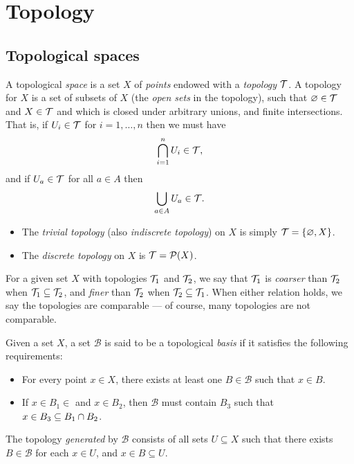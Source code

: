 \setchaptergraphic{}

\chapter{Topology}
\label{ch:topology}

\section{Topological spaces}

\begin{defn}
    A topological \emph{space} is a set $X$ of \emph{points} endowed with a \emph{topology} $\mathcal{T}$. A topology for $X$ is a set of subsets of $X$ (the \emph{open sets} in the topology), such that $\varnothing \in \mathcal{T}$ and $X \in \mathcal{T}$ and which is closed under arbitrary unions, and finite intersections. That is, if $U_i \in \mathcal{T}$ for $i = 1, \ldots, n$ then we must have
    \begin{align*}
        \bigcap_{i=1}^{n}U_i \in \mathcal{T},
    \end{align*}
    and if $U_{a} \in \mathcal{T}$ for all $a \in A$ then
    \begin{align*}
        \bigcup_{a\in A}U_a \in \mathcal{T}.
    \end{align*}
\end{defn}

\begin{exmp}\proofbreak
    \begin{itemize}
        \item The \emph{trivial topology} (also \emph{indiscrete topology}) on $X$ is simply $\mathcal{T} = \{\varnothing, X\}$.
        \item The \emph{discrete topology} on $X$ is $\mathcal{T} = \mathcal{P}(X)$. 
    \end{itemize}
\end{exmp}

\begin{defn}
    For a given set $X$ with topologies $\mathcal{T}_1$ and $\mathcal{T}_2$, we say that $\mathcal{T}_1$ is \emph{coarser} than $\mathcal{T}_2$ when $\mathcal{T}_1 \subseteq \mathcal{T}_2$, and \emph{finer} than $\mathcal{T}_2$ when $\mathcal{T}_2 \subseteq \mathcal{T}_1$. When either relation holds, we say the topologies are comparable ---  of course, many topologies are not comparable.
\end{defn}

\begin{defn}
    Given a set $X$, a set $\mathcal{B}$ is said to be a topological \emph{basis} if it satisfies the following requirements:
    \begin{itemize}
        \item For every point $x \in X$, there exists at least one $B \in \mathcal{B}$ such that $x \in B$.
        \item If $x \in B_1 \in$ and $x \in B_2$, then $\mathcal{B}$ must contain $B_3$ such that $x \in B_3 \subseteq B_1 \cap B_2$.
    \end{itemize}
    The topology \emph{generated} by $\mathcal{B}$ consists of all sets $U \subseteq X$ such that there exists $B \in \mathcal{B}$ for each $x \in U$, and $x \in B \subseteq U$.
\end{defn}

